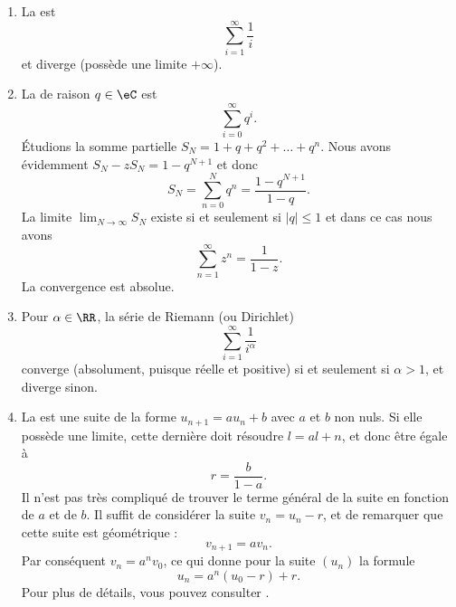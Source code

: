 \begin{example}\label{exemplesseries}
\begin{enumerate}

\item
    La  est
\begin{equation}
\sum_{i=1}^\infty \frac1i
\end{equation}
et diverge (possède une limite $+\infty$).

\item
    La  de raison $q \in \eC$ est
\begin{equation}
\sum_{i=0}^\infty q^i.
\end{equation}
Étudions la somme partielle \( S_N=1+q+q^2+\ldots +q^{n}\). Nous avons évidemment $S_N-zS_N=1-q^{N+1}$ et donc
\begin{equation}    \label{EqASYTiCK}
    S_N=\sum_{n=0}^Nq^n=\frac{ 1-q^{N+1} }{ 1-q }.
\end{equation}
La limite \( \lim_{N\to \infty} S_N\) existe si et seulement si \( | q |\leq 1\) et dans ce cas nous avons
\begin{equation}
    \sum_{n=1}^{\infty}z^n=\frac{ 1 }{ 1-z }.
\end{equation}
La convergence est absolue.

\item
Pour $\alpha \in \RR$, la série de Riemann (ou Dirichlet)
\begin{equation}        \label{EqSerRiem}
\sum_{i=1}^\infty \frac1{i^\alpha}
\end{equation}
converge (absolument, puisque réelle et positive) si et seulement
si $\alpha > 1$, et diverge sinon.

\item La  est une suite de la forme \( u_{n+1}=au_n+b\) avec \( a\) et \( b\) non nuls. Si elle possède une limite, cette dernière doit résoudre \( l=al+n\), et donc être égale à 
    \begin{equation}
        r=\frac{ b }{ 1-a }.
    \end{equation}
    Il n'est pas très compliqué de trouver le terme général de la suite en fonction de \( a\) et de \( b\). Il suffit de considérer la suite \( v_n=u_n-r\), et de remarquer que cette suite est géométrique :
    \begin{equation}
        v_{n+1}=av_n.
    \end{equation}
    Par conséquent \( v_n=a^nv_0\), ce qui donne pour la suite \( (u_n)\) la formule
    \begin{equation}
        u_n=a^n(u_0-r)+r.
    \end{equation}
    Pour plus de détails, vous pouvez consulter \cite{QXuqdoo}.

\end{enumerate}
\end{example}

